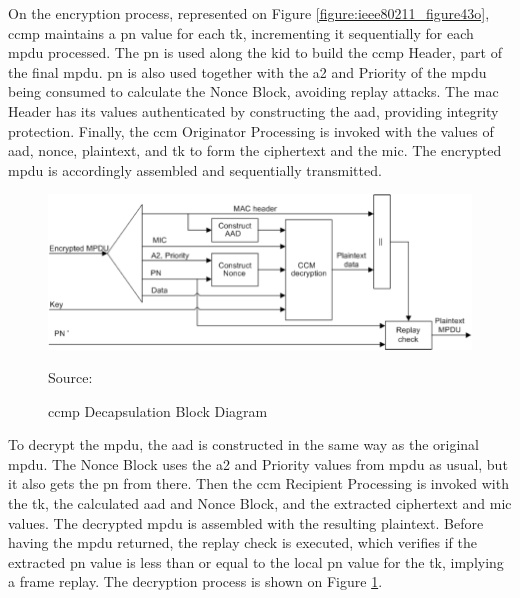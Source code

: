 On the encryption process, represented on Figure \ref{figure:ieee80211_figure43o}, \gls{ccmp} maintains a \gls{pn} value for each \gls{tk}, incrementing it sequentially for each \gls{mpdu} processed. The \gls{pn} is used along the \gls{kid} to build the \gls{ccmp} Header, part of the final \gls{mpdu}. \gls{pn} is also used together with the \gls{a2} and Priority of the \gls{mpdu} being consumed to calculate the Nonce Block, avoiding replay attacks. The \gls{mac} Header has its values authenticated by constructing the \gls{aad}, providing integrity protection. Finally, the \gls{ccm} Originator Processing is invoked with the values of \gls{aad}, nonce, plaintext, and \gls{tk} to form the ciphertext and the \gls{mic}. The encrypted \gls{mpdu} is accordingly assembled and sequentially transmitted.

\begin{figure}[h]
    \centering
    \includegraphics[width=\linewidth]{contents/background-in-wireless-networks/protected-network-standards/wpa2/ccmp/ccmp-decapsulation-block-diagram.png}
    \caption{\gls{ccmp} Decapsulation Block Diagram}
    {Source: \cite{ieee_80211_2020}}
    \label{figure:ieee80211_figure43r}
\end{figure}

To decrypt the \gls{mpdu}, the \gls{aad} is constructed in the same way as the original \gls{mpdu}. The Nonce Block uses the \gls{a2} and Priority values from \gls{mpdu} as usual, but it also gets the \gls{pn} from there. Then the \gls{ccm} Recipient Processing is invoked with the \gls{tk}, the calculated \gls{aad} and Nonce Block, and the extracted ciphertext and \gls{mic} values. The decrypted \gls{mpdu} is assembled with the resulting plaintext. Before having the \gls{mpdu} returned, the replay check is executed, which verifies if the extracted \gls{pn} value is less than or equal to the local \gls{pn} value for the \gls{tk}, implying a frame replay. The decryption process is shown on Figure \ref{figure:ieee80211_figure43r}.

\FloatBarrier
